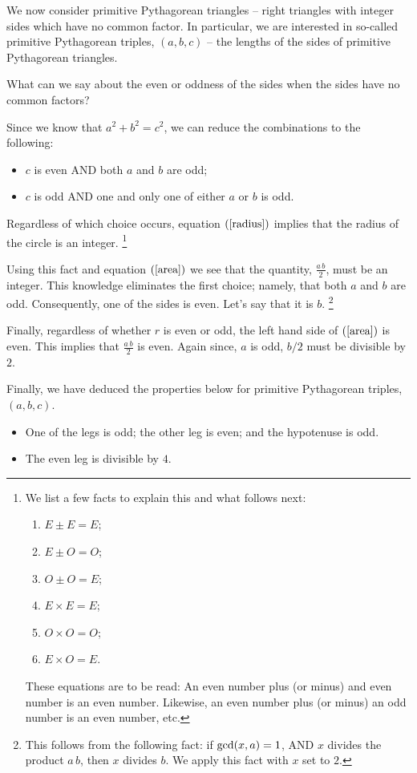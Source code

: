\documentclass[12pt]{article}
\begin{document}
We now consider primitive Pythagorean triangles -- right 
triangles with integer sides which have no common factor.
In particular, we are interested in so-called primitive Pythagorean triples,
$(a,b,c)$ -- the lengths of the sides of primitive Pythagorean triangles.

What can we say about the even or oddness of the sides when the sides have no 
common factors? 

Since we know that $a^2 + b^2 = c^2$, we can reduce the combinations to 
the following:
\begin{itemize}
  \item{$c$ is even AND both $a$ and $b$ are odd;}
  \item{$c$ is odd AND one and only one of either $a$ or $b$ is odd.}
\end{itemize}

Regardless of which choice occurs, equation $(\ref{radius})$ implies that 
the radius of the circle is an integer.%
\footnote{We list a few facts to explain this and what follows next:
\begin{enumerate}
    \item{$E \pm E = E$;}
    \item{$E \pm O = O$;}
    \item{$O \pm O = E$;}
    \item{$E \times E = E$;}
    \item{$O \times O = O$;}
    \item{$E \times O = E$.}
\end{enumerate}
These equations are to be read: An even number plus (or minus) and even number 
is an even number.
Likewise, an even number plus (or minus) an odd number is an even number, etc.}

Using this fact and equation $(\ref{area})$ we see that the quantity, 
$\frac{a \, b}{2}$, must be an integer. 
This knowledge eliminates the first choice; namely, that both $a$ and $b$ 
are odd. Consequently, one of the sides
is even. Let's say that it is $b$.%
\footnote{This follows from the following fact:
if ${\rm gcd}(x, a) = 1$, AND $x$ divides the product $a\, b$, then
$x$ divides $b$. We apply this fact with $x$ set to $2$.}

Finally, regardless of whether $r$ is even or odd, the left hand side of 
$(\ref{area})$ is even. This implies that $\frac{a \, b}{2}$
is even. Again since, $a$ is odd, $b/2$ must be divisible by $2$.

Finally, we have deduced the properties below for primitive Pythagorean triples, 
$(a,b,c)$.
\begin{itemize}
  \item{One of the legs is odd; the other leg is even; and the hypotenuse 
      is odd.}
  \item{The even leg is divisible by $4$.}
\end{itemize}
\end{document}
